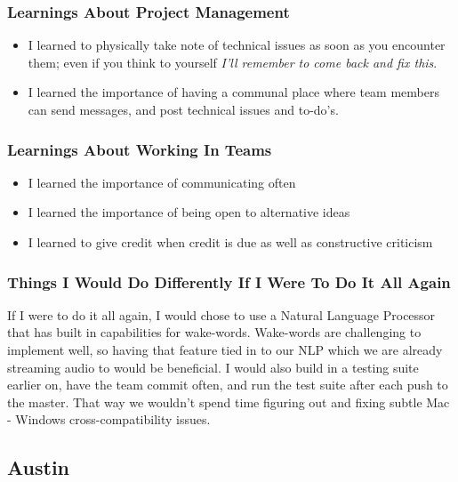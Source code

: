 \documentclass[onecolumn, draftclsnofoot,10pt, compsoc]{IEEEtran}
\begin{document}
	\subsubsection{Learnings About Project Management}
		\begin{itemize}
			\item I learned to physically take note of technical issues as soon as you  encounter them; even if you think to yourself \textit{I'll remember to come back and fix this}.
			\item I learned the importance of having a communal place where team members can send messages, and post technical issues and to-do's.
		\end{itemize}



	\subsubsection{Learnings About Working In Teams}
		\begin{itemize}
			\item I learned the importance of communicating often
			\item I learned the importance of being open to alternative ideas
			\item I learned to give credit when credit is due as well as constructive criticism
		\end{itemize}




	\subsubsection{Things I Would Do Differently If I Were To Do It All Again}
		If I were to do it all again, I would chose to use a Natural Language Processor that has built in capabilities for wake-words. Wake-words are challenging to implement well, so having that feature tied in to our NLP which we are already streaming audio to would be beneficial.
		I would also build in a testing suite earlier on, have the team commit often, and run the test suite after each push to the master. That way we wouldn't spend time figuring out and fixing subtle Mac - Windows cross-compatibility issues.





\subsection{Austin}
\end{document}
